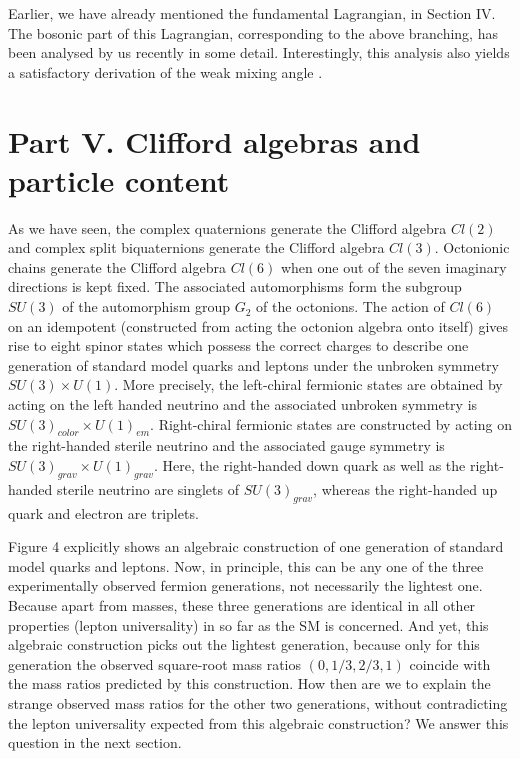 \documentclass{iopconfser}
\begin{document}
 Earlier, we have already mentioned the fundamental Lagrangian, in Section IV. The bosonic part of this Lagrangian, corresponding to the above branching, has been analysed by us recently in some detail. Interestingly, this analysis also yields a satisfactory derivation of the weak mixing angle \cite{Raj}.


\section{Part V. Clifford algebras and particle content}
As we have seen, the complex quaternions generate the Clifford algebra $Cl(2)$ and complex split biquaternions generate the Clifford algebra $Cl(3)$. Octonionic chains generate the Clifford algebra $Cl(6)$ when one out of the seven imaginary directions is kept fixed. The associated automorphisms form the subgroup $SU(3)$ of the automorphism group $G_2$ of the octonions. The action of $Cl(6)$ on an idempotent (constructed from acting the octonion algebra onto itself) gives rise to eight spinor states which possess the correct charges to describe one generation of standard model quarks and leptons under the unbroken symmetry $SU(3)\times U(1)$. More precisely, the left-chiral fermionic states are obtained by acting on the left handed neutrino and the associated unbroken symmetry is $SU(3)_{color} \times U(1)_{em}$. Right-chiral fermionic states are constructed by acting on the right-handed sterile neutrino and the associated gauge symmetry is $SU(3)_{grav}\times U(1)_{grav}$. Here, the right-handed down quark as well as the right-handed sterile neutrino are singlets of $SU(3)_{grav}$, whereas the right-handed up quark and electron are triplets. 

Figure 4 explicitly shows an algebraic construction of one generation of standard model quarks and leptons. Now, in principle, this can be any one of the three experimentally observed fermion generations, not necessarily the lightest one. Because apart from masses, these three generations are identical in all other properties (lepton universality) in so far as the SM is concerned. And yet, this algebraic construction picks out the lightest generation, because only for this generation the observed square-root mass ratios $(0,1/3,2/3,1)$ coincide with the mass ratios predicted by this construction. How then are we to explain the strange observed mass ratios for the other two generations, without contradicting the lepton universality expected from this algebraic construction? We answer this question in the next section.
\end{document}

